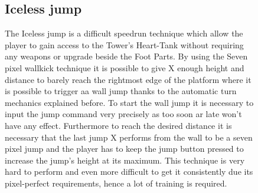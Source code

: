 \begin{figure}[htp]
\subsection{Iceless jump}
The Iceless jump is a difficult speedrun technique which allow the player to gain access to the Tower's Heart-Tank without requiring any weapons or upgrade beside the Foot Parts. By using the Seven pixel wallkick technique it is possible to give X enough height and distance to barely reach the rightmost edge of the platform where it is possible to trigger aa wall jump thanks to the automatic turn mechanics explained before. To start the wall jump it is necessary to input the jump command very precisely as too soon ar late won't have any effect. Furthermore to reach the desired distance it is necessary that the last jump X performs from the wall to be a seven pixel jump and the player has to keep the jump button pressed to increase the jump's height at its maximum. 
This technique is very hard to perform and even more difficult to get it consistently due its pixel-perfect requirements, hence a lot of training is required.


\end{figure}
